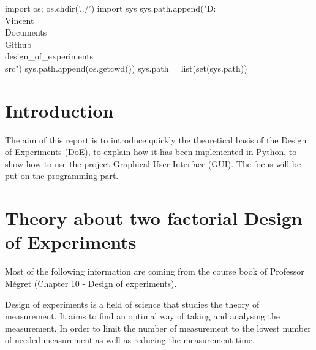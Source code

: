 \documentclass[english, 12 pt, openany, oneside]{book}
\begin{document}
\begin{pyconcode}
import os;
os.chdir('../')
import sys
sys.path.append("D:\\Vincent\\Documents\\Github\\design_of_experiments\\src")
sys.path.append(os.getcwd())
sys.path = list(set(sys.path))
\end{pyconcode}



\umonsCoverPage

\frontmatter
\tableofcontents


\mainmatter
{}
\chapter*{Introduction}
The aim of this report is to introduce quickly the theoretical basis of the Design of Experiments (DoE), to explain how it has been implemented in Python, to show how to use the project Graphical User Interface (GUI). The focus will be put on the programming part.

\chapter{Theory about two factorial Design of Experiments}
Most of the following information are coming from the course book of Professor Mégret (Chapter 10 - Design of experiments).

Design of experiments is a field of science that studies the theory of measurement. It aims to find an optimal way of taking and analysing the measurement. In order to limit the number of measurement to the lowest number of needed measurement as well as reducing the measurement time.
\end{document}

